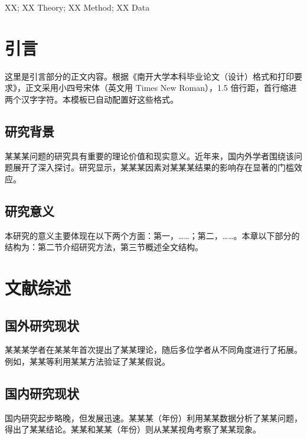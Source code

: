 \documentclass[12pt,openright]{book}
\begin{document}
\begin{keywords}
XX; XX Theory; XX Method; XX Data
\end{keywords}

\tableofcontents

\mainmatter

\chapter{引言}

\noindent 这里是引言部分的正文内容。根据《南开大学本科毕业论文（设计）格式和打印要求》，正文采用小四号宋体（英文用 Times New Roman），1.5 倍行距，首行缩进两个汉字字符。本模板已自动配置好这些格式。

\section{研究背景}
某某某问题的研究具有重要的理论价值和现实意义。近年来，国内外学者围绕该问题展开了深入探讨\cite{ref_book_cn}。研究显示，某某某因素对某某某结果的影响存在显著的门槛效应\cite{ref_article_en}。

\section{研究意义}
本研究的意义主要体现在以下两个方面：第一，……；第二，……。本章以下部分的结构为：第二节介绍研究方法，第三节概述全文结构。

\chapter{文献综述}

\section{国外研究现状}
某某某学者在某某年首次提出了某某理论\cite{ref_conf_en}，随后多位学者从不同角度进行了拓展\cite{ref_book_en}。例如，某某等利用某某方法验证了某某假说\cite{ref_article_en}。

\section{国内研究现状}
国内研究起步略晚，但发展迅速。某某某（年份）利用某某数据分析了某某问题\cite{ref_thesis_cn}，得出了某某结论。某某和某某（年份）则从某某视角考察了某某现象\cite{ref_article_cn}。
\end{document}
